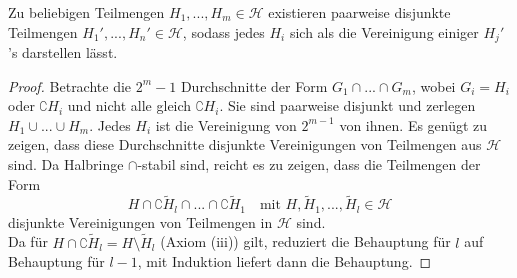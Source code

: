 \begin{lemma}
Zu beliebigen Teilmengen $H_1,...,H_m \in \mathcal{H}$ existieren paarweise disjunkte Teilmengen $H_1',...,H_n' \in \mathcal{H}$, sodass jedes $H_i$ sich als die Vereinigung einiger $H_j'$'s darstellen lässt.
 \label{lemmaA}
\begin{proof}
Betrachte die $2^m-1$ Durchschnitte der Form $G_1 \cap ... \cap G_m$, wobei $G_i = H_i$ oder $\complement H_i$ und nicht alle gleich $\complement H_i$. Sie sind paarweise disjunkt und zerlegen $H_1 \cup ... \cup H_m$. Jedes $H_i$ ist die Vereinigung von $2^{m-1}$ von ihnen. Es genügt zu zeigen, dass diese Durchschnitte disjunkte Vereinigungen von Teilmengen aus $\mathcal{H}$ sind. Da Halbringe $\cap$-stabil sind, reicht es zu zeigen, dass die Teilmengen der Form
\begin{equation}
H \cap \complement \widetilde{H}_l \cap ... \cap \complement \widetilde{H}_1	\quad \text{mit }H,\widetilde{H}_1,...,\widetilde{H}_l \in \mathcal{H}
\end{equation}
disjunkte Vereinigungen von Teilmengen in $\mathcal{H}$ sind. \\
Da für $H \cap \complement \widetilde{H}_l = H \setminus \widetilde{H}_l$ (Axiom (iii)) gilt, reduziert die Behauptung für $l$ auf Behauptung für $l-1$, mit Induktion liefert dann die Behauptung.
\end{proof}
\end{lemma}



